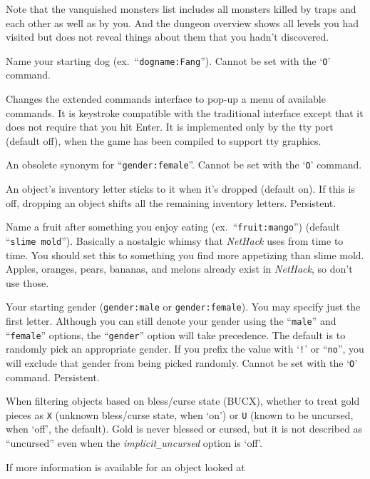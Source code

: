 Note that the vanquished monsters list includes all monsters killed by
traps and each other as well as by you. 
And the dungeon overview shows all levels you had visited but does not
reveal things about them that you hadn't discovered.
\item[\ib{dogname}]
Name your starting dog (ex.\ ``{\tt dogname:Fang}'').
Cannot be set with the `{\tt O}' command.
\item[\ib{extmenu}]
Changes the extended commands interface to pop-up a menu of available commands.
It is keystroke compatible with the traditional interface except that it does
not require that you hit Enter.  It is implemented only by the tty port 
(default off), when the game has been compiled to support tty graphics.
\item[\ib{female}]
An obsolete synonym for ``{\tt gender:female}''.  Cannot be set with the
`{\tt O}' command.
\item[\ib{fixinv}]
An object's inventory letter sticks to it when it's dropped (default on).
If this is off, dropping an object shifts all the remaining inventory letters.
Persistent.
\item[\ib{fruit}]
Name a fruit after something you enjoy eating (ex.\ ``{\tt fruit:mango}'')
(default ``{\tt slime mold}''). Basically a nostalgic whimsy that
{\it NetHack\/} uses from time to time.  You should set this to something you
find more appetizing than slime mold.  Apples, oranges, pears, bananas, and
melons already exist in {\it NetHack}, so don't use those.
\item[\ib{gender}]
Your starting gender ({\tt gender:male} or {\tt gender:female}).
You may specify just the first letter.  Although you can
still denote your gender using the ``{\tt male}'' and ``{\tt female}''
options, the ``{\tt gender}'' option will take precedence.
The default is to randomly pick an appropriate gender.
If you prefix the value with `{\tt !}' or ``{\tt no}'', you will
exclude that gender from being picked randomly. 
Cannot be set with the `{\tt O}' command.  Persistent.
\item[\ib{goldX}]
When filtering objects based on bless/curse state (BUCX), whether to
treat gold pieces as {\tt X} (unknown bless/curse state, when `on')
or {\tt U} (known to be uncursed, when `off', the default).
Gold is never blessed or cursed, but it is not described as ``uncursed''
even when the {\it implicit\verb+_+uncursed\/} option is `off'.
\item[\ib{help}]
If more information is available for an object looked at
